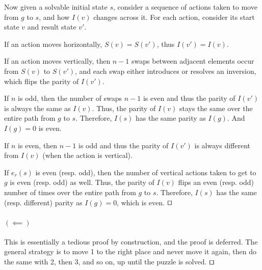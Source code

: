 \documentclass[runningheads]{llncs}
\begin{document}
Now given a solvable initial state $s$, consider a sequence of actions taken to move from $g$ to $s$, and how $I(v)$ changes across it. For each action, consider its start state $v$ and result state $v'$.

If an action moves horizontally, $S(v) = S(v')$, thus $I(v') = I(v)$.

If an action moves vertically, then $n-1$ swaps between adjacent elements occur from $S(v)$ to $S(v')$, and each swap either introduces or resolves an inversion, which flips the parity of $I(v')$.

If $n$ is odd, then the number of swaps $n-1$ is even and thus the parity of $I(v')$ is always the same as $I(v)$. Thus, the parity of $I(v)$ stays the same over the entire path from $g$ to $s$. Therefore, $I(s)$ has the same parity as $I(g)$. And $I(g) = 0$ is even.

If $n$ is even, then $n-1$ is odd and thus the parity of $I(v')$ is always different from $I(v)$ (when the action is vertical).

If $e_r(s)$ is even (resp. odd), then the number of vertical actions taken to get to $g$ is even (resp. odd) as well. Thus, the parity of $I(v)$ flips an even (resp. odd) number of times over the entire path from $g$ to $s$. Therefore, $I(s)$ has the same (resp. different) parity as $I(g) = 0$, which is even.
$\qed$

\paragraph{$(\impliedby)$}
This is essentially a tedious proof by construction, and the proof is deferred. The general strategy is to move 1 to the right place and never move it again, then do the same with 2, then 3, and so on, up until the puzzle is solved.
$\qed$






\end{document}
